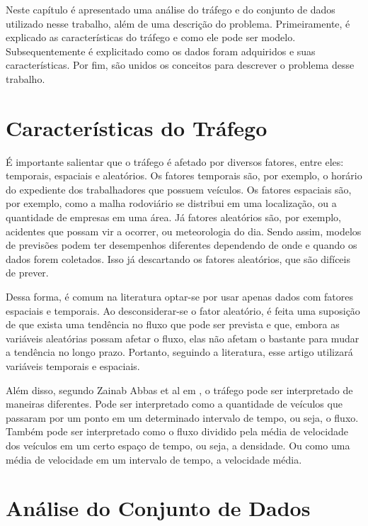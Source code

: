 Neste capítulo é apresentado uma análise do tráfego e do conjunto de dados utilizado nesse trabalho, além de uma descrição do problema. Primeiramente, é explicado as características do tráfego e como ele pode ser modelo. Subsequentemente é explicitado como os dados foram adquiridos e suas características. Por fim, são unidos os conceitos para descrever o problema desse trabalho.

\section{Características do Tráfego}

É importante salientar que o tráfego é afetado por diversos fatores, entre eles: temporais, espaciais e aleatórios. Os fatores temporais são, por exemplo, o horário do expediente dos trabalhadores que possuem veículos. Os fatores espaciais são, por exemplo, como a malha rodoviário se distribui em uma localização, ou a quantidade de empresas em uma área. Já fatores aleatórios são, por exemplo, acidentes que possam vir a ocorrer, ou meteorologia do dia. Sendo assim, modelos de previsões podem ter desempenhos diferentes dependendo de onde e quando os dados forem coletados. Isso já descartando os fatores aleatórios, que são difíceis de prever. \cite{}

Dessa forma, é comum na literatura optar-se por usar apenas dados com fatores espaciais e temporais. Ao desconsiderar-se o fator aleatório, é feita uma suposição de que exista uma tendência no fluxo que pode ser prevista e que, embora as variáveis aleatórias possam afetar o fluxo, elas não afetam o bastante para mudar a tendência no longo prazo. Portanto, seguindo a literatura, esse artigo utilizará variáveis temporais e espaciais. \cite{lan}


Além disso, segundo Zainab Abbas et al em \cite{Zainab_2018}, o tráfego pode ser interpretado de maneiras diferentes. Pode ser interpretado como a quantidade de veículos que passaram por um ponto em um determinado intervalo de tempo, ou seja, o fluxo. Também pode ser interpretado como o fluxo dividido pela média de velocidade dos veículos em um certo espaço de tempo, ou seja, a densidade. Ou como uma média de velocidade em um intervalo de tempo, a velocidade média.

\section{Análise do Conjunto de Dados}


